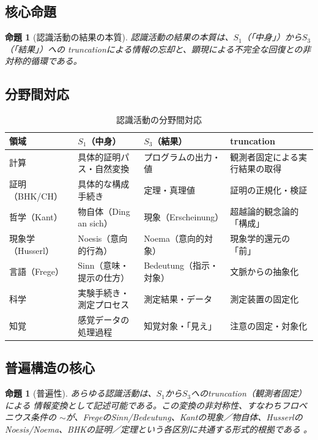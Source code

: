 \documentclass[11pt,a4paper]{ltjsarticle}
\newtheorem{proposition}[definition]{命題}
\theoremstyle{remark}
\begin{document}
\subsection{核心命題}

\begin{proposition}[認識活動の結果の本質]
認識活動の結果の本質は、$S_1$（「中身」）から$S_3$（「結果」）への
truncationによる情報の忘却と、顕現による不完全な回復との非対称的循環である。
\end{proposition}

\subsection{分野間対応}

\begin{table}[htbp]
\centering
\caption{認識活動の分野間対応}
\label{tab:epistemology-domains}
\scriptsize
\begin{tabularx}{\textwidth}{@{}l >{\raggedright\arraybackslash}X >{\raggedright\arraybackslash}X >{\raggedright\arraybackslash}X@{}}
\toprule
領域 & $S_1$（中身） & $S_3$（結果） & truncation \\
\midrule
計算 & 具体的証明パス・自然変換 & プログラムの出力・値 & 観測者固定による実行結果の取得 \\
証明（BHK/CH） & 具体的な構成手続き & 定理・真理値 & 証明の正規化・検証 \\
哲学（Kant） & 物自体（Ding an sich） & 現象（Erscheinung） & 超越論的観念論的「構成」 \\
現象学（Husserl） & Noesis（意向的行為） & Noema（意向的対象） & 現象学的還元の「前」 \\
言語（Frege） & Sinn（意味・提示の仕方） & Bedeutung（指示・対象） & 文脈からの抽象化 \\
科学 & 実験手続き・測定プロセス & 測定結果・データ & 測定装置の固定化 \\
知覚 & 感覚データの処理過程 & 知覚対象・「見え」 & 注意の固定・対象化 \\
\bottomrule
\end{tabularx}
\end{table}

\subsection{普遍構造の核心}

\begin{proposition}[普遍性]
あらゆる認識活動は、$S_1$から$S_3$へのtruncation（観測者固定）による
情報変換として記述可能である。この変換の非対称性、すなわちフロベニウス条件の
$\sim$が、FregeのSinn/Bedeutung、Kantの現象／物自体、Husserlの
Noesis/Noema、BHKの証明／定理という各区別に共通する形式的根拠である
\cite{Wadler2015,Schwichtenberg2019,Kant,Husserl}。
\end{proposition}
\end{document}
